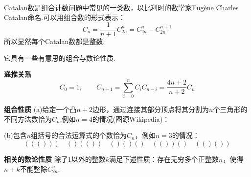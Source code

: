 \documentclass[lang=cn, zihao=5]{elegantbook}
\newcommand{\examplefont}[1]{\color{mgreen} \textbf{#1}}
\begin{document}
Catalan数是组合计数问题中常见的一类数，以比利时的数学家Eugène Charles Catalan命名.可以用组合数的形式表示：$$C_n = \frac{1}{n+1} C_{2n}^{n} = C_{2n}^n - C_{2n}^{n+1}$$
所以显然每个Catalan数都是整数.

它具有一些有意思的组合与数论性质.

\begin{example}{\examplefont{递推关系}}
	$$C_0=1,\qquad C_{n+1} = \sum_{i=0}^{n} C_iC_{n-i} = \frac{4n+2}{n+2} C_n$$
\end{example}

\begin{example}{\examplefont{组合性质}}
	(a)给定一个凸$n+2$边形，通过连接其部分顶点将其分割为$n$个三角形的不同方法数恰为$C_n$.例如$n=4$的情况(图源Wikipedia)：
	\begin{figure}[h!]
	\centering
	
	\end{figure}
	
	\noindent
	(b)包含$n$组括号的合法运算式的个数恰为$C_n$，例如$n=3$的情况：$$((())) \quad ()(()) \quad ()()() \quad (())() \quad (()())$$
\end{example}

\begin{example}{\examplefont{相关的数论性质}}
	除了$1$以外的整数$k$满足下述性质：存在无穷多个正整数$n$，使得$n+k$不能整除$C_{2n}^{n}$.
\end{example}
\end{document}
